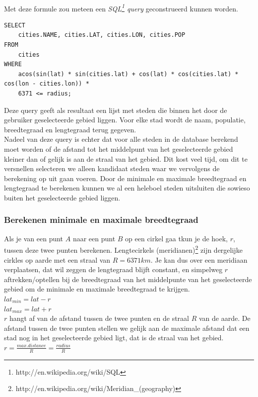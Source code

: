 \documentclass[twoside,openright]{uva-bachelor-thesis}
\begin{document}
		\\[0.5cm]
		Met deze formule zou meteen een \textit{SQL\footnote{http://en.wikipedia.org/wiki/SQL} query} geconstrueerd kunnen worden.
\begin{verbatim}
SELECT
    cities.NAME, cities.LAT, cities.LON, cities.POP
FROM 
    cities 
WHERE 
    acos(sin(lat) * sin(cities.lat) + cos(lat) * cos(cities.lat) * cos(lon - cities.lon)) * 
    6371 <= radius;
\end{verbatim}
		Deze query geeft als resultaat een lijst met steden die binnen het door de gebruiker geselecteerde gebied liggen. Voor elke stad wordt de naam, populatie, breedtegraad en lengtegraad terug gegeven.
		\\[0.5cm]
		Nadeel van deze query is echter dat voor alle steden in de database berekend moet worden of de afstand tot het middelpunt van het geselecteerde gebied kleiner dan of gelijk is aan de straal van het gebied. Dit kost veel tijd, om dit te versnellen selecteren we alleen kandidaat steden waar we vervolgens de berekening op uit gaan voeren. Door de minimale en maximale breedtegraad en lengtegraad te berekenen kunnen we al een heleboel steden uitsluiten die sowieso buiten het geselecteerde gebied liggen.
		\subsubsection{Berekenen minimale en maximale breedtegraad}
		Als je van een punt $A$ naar een punt $B$ op een cirkel gaa tkun je de hoek, $r$, tussen deze twee punten berekenen. Lengtecirkels (meridianen)\footnote{http://en.wikipedia.org/wiki/Meridian\_(geography)} zijn dergelijke cirkles op aarde met een straal van $R = 6371km$. Je kan dus over een meridiaan verplaatsen, dat wil zeggen de lengtegraad blijft constant, en simpelweg $r$ aftrekken/optellen bij de breedtegraad van het middelpunte van het geselecteerde gebied om de minimale en maximale breedtegraad te krijgen.
		\\[0.5cm]
		$lat_{min} = lat - r$ \\
		$lat_{max} = lat + r$
		\\[0.5cm]
		$r$ hangt af van de afstand tussen de twee punten en de straal $R$ van de aarde. De afstand tussen de twee punten stellen we gelijk aan de maximale afstand dat een stad nog in het geselecteerde gebied ligt, dat is de straal van het gebied.
		\\[0.5cm]
		$r = \frac{max. distance}{R} = \frac{radius}{R}$
\end{document}
